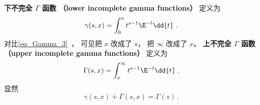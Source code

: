 
\begin{issues}
\issueDraft
\end{issues}


\textbf{下不完全 $\Gamma$ 函数 （lower incomplete gamma functions）} 定义为
\begin{equation}
\gamma(s, x) = \int_0^x t^{s-1}\E^{-t} \dd{t}~.
\end{equation}
对比\autoref{eq_Gamma_3}~， 可见把 $x$ 改成了 $s$， 把 $\infty$ 改成了 $x$。
\textbf{上不完全 $\Gamma$ 函数 （upper incomplete gamma functions）} 定义为
\begin{equation}
\Gamma(s, x) = \int_x^\infty t^{s-1}\E^{-t} \dd{t}~.
\end{equation}
显然
\begin{equation}
\gamma(s, x) + \Gamma(s, x) = \Gamma(s)~.
\end{equation}
